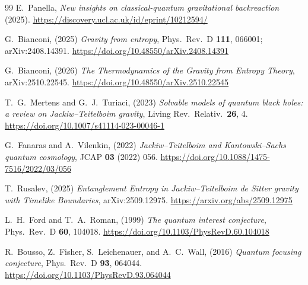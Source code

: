 \documentclass[11pt]{article}
\begin{document}
\begin{thebibliography}{99}
 E.~Panella, \emph{New insights on classical-quantum gravitational backreaction} (2025). \newline \url{https://discovery.ucl.ac.uk/id/eprint/10212594/}

 G.~Bianconi, (2025) \emph{Gravity from entropy}, Phys.\ Rev.\ D \textbf{111}, 066001; arXiv:2408.14391.
\newline \url{https://doi.org/10.48550/arXiv.2408.14391}

 G.~Bianconi, (2026) \emph{The Thermodynamics of the Gravity from Entropy Theory}, arXiv:2510.22545.
\newline \url{https://doi.org/10.48550/arXiv.2510.22545}

 T.~G.~Mertens and G.~J.~Turiaci, (2023) \emph{Solvable models of quantum black holes: a review on Jackiw--Teitelboim gravity}, Living Rev.\ Relativ.\ \textbf{26}, 4.
\url{https://doi.org/10.1007/s41114-023-00046-1}

 G.~Fanaras and A.~Vilenkin, (2022) \emph{Jackiw--Teitelboim and Kantowski--Sachs quantum cosmology}, JCAP \textbf{03} (2022) 056.
\url{https://doi.org/10.1088/1475-7516/2022/03/056}

 T.~Rusalev, (2025) \emph{Entanglement Entropy in Jackiw--Teitelboim de Sitter gravity with Timelike Boundaries}, arXiv:2509.12975. \url{https://arxiv.org/abs/2509.12975}


 L.~H.~Ford and T.~A.~Roman, (1999) \emph{The quantum interest conjecture}, Phys.\ Rev.\ D \textbf{60}, 104018.
\newline
\url{https://doi.org/10.1103/PhysRevD.60.104018}

 R.~Bousso, Z.~Fisher, S.~Leichenauer, and A.~C.~Wall, (2016) \emph{Quantum focusing conjecture}, Phys.\ Rev.\ D \textbf{93}, 064044.
\url{https://doi.org/10.1103/PhysRevD.93.064044}

\end{thebibliography}
\endgroup
\end{document}
